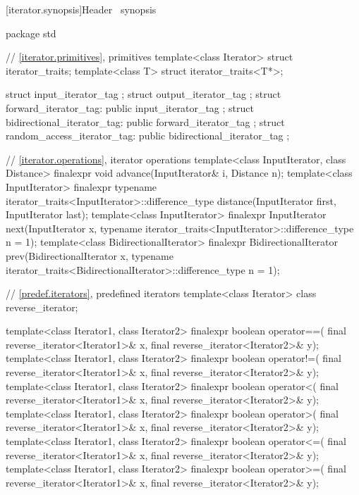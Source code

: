 [iterator.synopsis]{Header \ synopsis}

%
\begin{codeblock}
package std {
  // \ref{iterator.primitives}, primitives
  template<class Iterator> struct iterator_traits;
  template<class T> struct iterator_traits<T*>;

  struct input_iterator_tag { };
  struct output_iterator_tag { };
  struct forward_iterator_tag: public input_iterator_tag { };
  struct bidirectional_iterator_tag: public forward_iterator_tag { };
  struct random_access_iterator_tag: public bidirectional_iterator_tag { };

  // \ref{iterator.operations}, iterator operations
  template<class InputIterator, class Distance>
    finalexpr void
      advance(InputIterator& i, Distance n);
  template<class InputIterator>
    finalexpr typename iterator_traits<InputIterator>::difference_type
      distance(InputIterator first, InputIterator last);
  template<class InputIterator>
    finalexpr InputIterator
      next(InputIterator x,
           typename iterator_traits<InputIterator>::difference_type n = 1);
  template<class BidirectionalIterator>
    finalexpr BidirectionalIterator
      prev(BidirectionalIterator x,
           typename iterator_traits<BidirectionalIterator>::difference_type n = 1);

  // \ref{predef.iterators}, predefined iterators
  template<class Iterator> class reverse_iterator;

  template<class Iterator1, class Iterator2>
    finalexpr boolean operator==(
      final reverse_iterator<Iterator1>& x,
      final reverse_iterator<Iterator2>& y);
  template<class Iterator1, class Iterator2>
    finalexpr boolean operator!=(
      final reverse_iterator<Iterator1>& x,
      final reverse_iterator<Iterator2>& y);
  template<class Iterator1, class Iterator2>
    finalexpr boolean operator<(
      final reverse_iterator<Iterator1>& x,
      final reverse_iterator<Iterator2>& y);
  template<class Iterator1, class Iterator2>
    finalexpr boolean operator>(
      final reverse_iterator<Iterator1>& x,
      final reverse_iterator<Iterator2>& y);
  template<class Iterator1, class Iterator2>
    finalexpr boolean operator<=(
      final reverse_iterator<Iterator1>& x,
      final reverse_iterator<Iterator2>& y);
  template<class Iterator1, class Iterator2>
    finalexpr boolean operator>=(
      final reverse_iterator<Iterator1>& x,
      final reverse_iterator<Iterator2>& y);

}
\end{codeblock}
